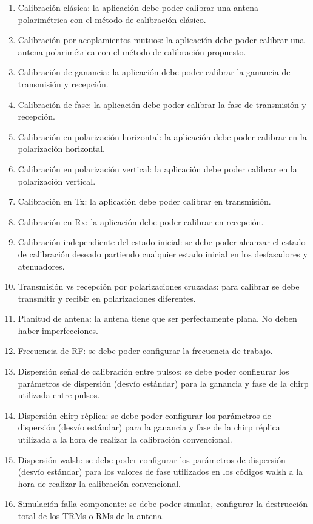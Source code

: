 \begin{enumerate}
    \item Calibración clásica: la aplicación debe poder calibrar una antena polarimétrica con el método de calibración clásico.

    \item Calibración por acoplamientos mutuos: la aplicación debe poder calibrar una antena polarimétrica con el método de
		calibración propuesto.

    \item Calibración de ganancia: la aplicación debe poder calibrar la ganancia de transmisión y recepción.

    \item Calibración de fase: la aplicación debe poder calibrar la fase de transmisión y recepción.

    \item Calibración en polarización horizontal: la aplicación debe poder calibrar en la polarización horizontal.
    \item Calibración en polarización vertical: la aplicación debe poder calibrar en la polarización vertical.
    \item Calibración en Tx: la aplicación debe poder calibrar en transmisión.
    \item Calibración en Rx: la aplicación debe poder calibrar en recepción.

    \item Calibración independiente del estado inicial: se debe poder alcanzar el estado de calibración deseado partiendo
		cualquier estado inicial en los desfasadores y atenuadores.

    \item Transmisión vs recepción por polarizaciones cruzadas: para calibrar se debe transmitir y recibir en polarizaciones
		diferentes.

    \item Planitud de antena: la antena tiene que ser perfectamente plana. No deben haber imperfecciones.

    \item Frecuencia de RF: se debe poder configurar la frecuencia de trabajo.

    \item Dispersión señal de calibración entre pulsos: se debe poder configurar los parámetros de dispersión (desvío estándar) para
		la ganancia y fase de la chirp utilizada entre pulsos.

    \item Dispersión chirp réplica: se debe poder configurar los parámetros de dispersión (desvío estándar) para la
		ganancia y fase de la chirp réplica utilizada a la hora de realizar la calibración convencional.

    \item Dispersión walsh: se debe poder configurar los parámetros de dispersión (desvío estándar) para los valores de fase
		utilizados en los códigos walsh a la hora de realizar la calibración convencional.

    \item Simulación falla componente: se debe poder simular, configurar la destrucción total de los TRMs o RMs de la antena.
\end{enumerate}


